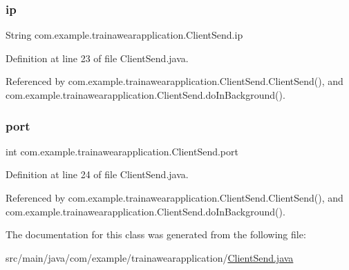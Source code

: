 \subsubsection{\texorpdfstring{ip}{ip}}
{\footnotesize\ttfamily String com.\+example.\+trainawearapplication.\+Client\+Send.\+ip\hspace{0.3cm}{\ttfamily [private]}}



Definition at line 23 of file Client\+Send.\+java.



Referenced by com.\+example.\+trainawearapplication.\+Client\+Send.\+Client\+Send(), and com.\+example.\+trainawearapplication.\+Client\+Send.\+do\+In\+Background().

\mbox{\label{classcom_1_1example_1_1trainawearapplication_1_1_client_send_a1295f5916c4527127a9dd68b7c6fe759}} 
\subsubsection{\texorpdfstring{port}{port}}
{\footnotesize\ttfamily int com.\+example.\+trainawearapplication.\+Client\+Send.\+port\hspace{0.3cm}{\ttfamily [private]}}



Definition at line 24 of file Client\+Send.\+java.



Referenced by com.\+example.\+trainawearapplication.\+Client\+Send.\+Client\+Send(), and com.\+example.\+trainawearapplication.\+Client\+Send.\+do\+In\+Background().



The documentation for this class was generated from the following file\+:\begin{DoxyCompactItemize}
\item 
src/main/java/com/example/trainawearapplication/\mbox{\hyperlink{_client_send_8java}{Client\+Send.\+java}}\end{DoxyCompactItemize}
